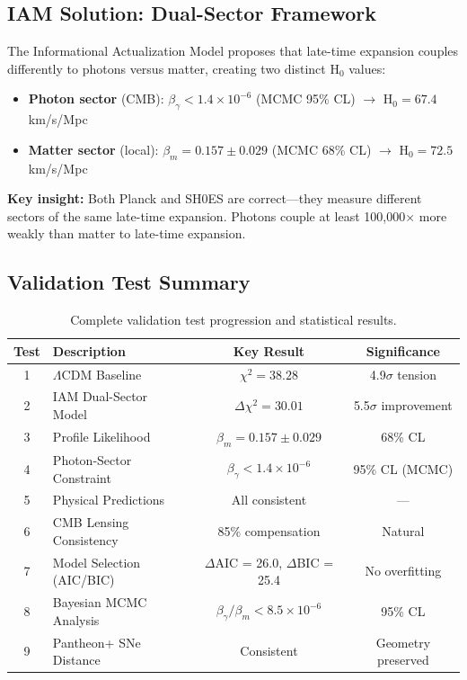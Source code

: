 \documentclass[11pt,letterpaper]{article}
\begin{document}
\subsection{IAM Solution: Dual-Sector Framework}

The Informational Actualization Model proposes that late-time expansion couples differently to photons versus matter, creating two distinct H$_0$ values:

\begin{itemize}
\item \textbf{Photon sector} (CMB): $\beta_\gamma < 1.4 \times 10^{-6}$ (MCMC 95\% CL) $\rightarrow$ H$_0 = 67.4$ km/s/Mpc
\item \textbf{Matter sector} (local): $\beta_m = 0.157 \pm 0.029$ (MCMC 68\% CL) $\rightarrow$ H$_0 = 72.5$ km/s/Mpc
\end{itemize}

\noindent\textbf{Key insight:} Both Planck and SH0ES are correct---they measure different sectors of the same late-time expansion. Photons couple at least 100,000$\times$ more weakly than matter to late-time expansion.

\subsection{Validation Test Summary}

\begin{table}[h]
\centering
\begin{tabular}{clcc}
\toprule
Test & Description & Key Result & Significance \\
\midrule
1 & $\Lambda$CDM Baseline & $\chi^2 = 38.28$ & 4.9$\sigma$ tension \\
2 & IAM Dual-Sector Model & $\Delta\chi^2 = 30.01$ & 5.5$\sigma$ improvement \\
3 & Profile Likelihood & $\beta_m = 0.157 \pm 0.029$ & 68\% CL \\
4 & Photon-Sector Constraint & $\beta_\gamma < 1.4 \times 10^{-6}$ & 95\% CL (MCMC) \\
5 & Physical Predictions & All consistent & --- \\
6 & CMB Lensing Consistency & 85\% compensation & Natural \\
7 & Model Selection (AIC/BIC) & $\Delta$AIC = 26.0, $\Delta$BIC = 25.4 & No overfitting \\
8 & Bayesian MCMC Analysis & $\beta_\gamma/\beta_m < 8.5 \times 10^{-6}$ & 95\% CL \\
9 & Pantheon+ SNe Distance & Consistent & Geometry preserved \\
\bottomrule
\end{tabular}
\caption{Complete validation test progression and statistical results.}
\end{table}
\end{document}
